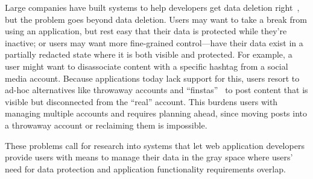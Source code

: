 Large companies have built systems to help developers get data deletion
right~\cite{delf}, but the problem goes beyond data deletion. Users may want to
take a break from using an application, but rest easy that their data is
protected while they’re inactive; or users may want more fine-grained
control—\ie have their data exist in a partially redacted state where it is both
visible and protected. For example, a user might want to disassociate content
with a specific hashtag from a social media account. Because applications today
lack support for this, users resort to ad-hoc alternatives like throwaway
accounts and ``finstas''~\cite{reddit:throwaway, nytimes:finsta} to post content
that is visible but disconnected from the ``real'' account. This burdens users
with managing multiple accounts and requires planning ahead, since moving posts
into a throwaway account or reclaiming them is impossible.

These problems call for research into systems that let web application
developers provide users with means to manage their data in the gray space where
users' need for data protection and application functionality requirements
overlap. 
